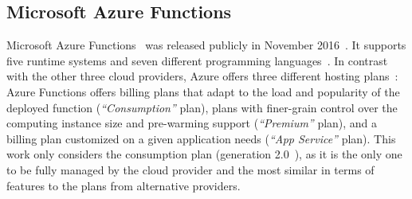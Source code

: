 \subsection{Microsoft Azure Functions}
\label{sec:ss:azure}

Microsoft Azure Functions~\cite{AzureFunctions} was released publicly in November 2016~\cite{AzureFunctionsAnnouncement}. %
It supports five runtime systems and seven different programming languages~\cite{AzureFunctionsLanguages}.
In contrast with the other three cloud providers, Azure offers three different hosting plans~\cite{AzureFunctionsPlans}:
Azure Functions offers billing plans that adapt to the load and popularity of the deployed function (\emph{``Consumption''} plan), plans with finer-grain control over the computing instance size and pre-warming support (\emph{``Premium''} plan), and a billing plan customized on a given application needs (\emph{``App Service''} plan). 
This work only considers the consumption plan (generation 2.0~\cite{AzureFunctionsGenerations}), as it is the only one to be fully managed by the cloud provider and the most similar in terms of features to the plans from alternative providers. 

